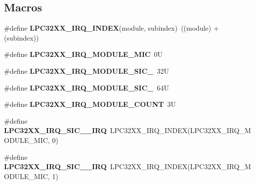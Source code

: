 \subsection*{Macros}
\begin{DoxyCompactItemize}
\item 
\mbox{\label{group__lpc32xx__interrupt_ga82995a9f4d6d60e7406272ca7e5f2d15}} 
\#define {\bfseries L\+P\+C32\+X\+X\+\_\+\+I\+R\+Q\+\_\+\+I\+N\+D\+EX}(module,  subindex)~((module) + (subindex))
\item 
\mbox{\label{group__lpc32xx__interrupt_ga17f517d512c53ce9bf3fa0daf0e6e24d}} 
\#define {\bfseries L\+P\+C32\+X\+X\+\_\+\+I\+R\+Q\+\_\+\+M\+O\+D\+U\+L\+E\+\_\+\+M\+IC}~0U
\item 
\mbox{\label{group__lpc32xx__interrupt_gac38072e9ceffb69d71f811b99d75469b}} 
\#define {\bfseries L\+P\+C32\+X\+X\+\_\+\+I\+R\+Q\+\_\+\+M\+O\+D\+U\+L\+E\+\_\+\+S\+I\+C\+\_}~32U
\item 
\mbox{\label{group__lpc32xx__interrupt_gac5498c0faeeb6900db20a858ac2093c1}} 
\#define {\bfseries L\+P\+C32\+X\+X\+\_\+\+I\+R\+Q\+\_\+\+M\+O\+D\+U\+L\+E\+\_\+\+S\+I\+C\+\_}~64U
\item 
\mbox{\label{group__lpc32xx__interrupt_ga88f3b8aae69d1f2cc6c67c21262e614b}} 
\#define {\bfseries L\+P\+C32\+X\+X\+\_\+\+I\+R\+Q\+\_\+\+M\+O\+D\+U\+L\+E\+\_\+\+C\+O\+U\+NT}~3U
\item 
\mbox{\label{group__lpc32xx__interrupt_gad91fbc0b5d54be2d39839463cdf3e7b2}} 
\#define {\bfseries L\+P\+C32\+X\+X\+\_\+\+I\+R\+Q\+\_\+\+S\+I\+C\+\_\+\_\+\+I\+RQ}~L\+P\+C32\+X\+X\+\_\+\+I\+R\+Q\+\_\+\+I\+N\+D\+EX(L\+P\+C32\+X\+X\+\_\+\+I\+R\+Q\+\_\+\+M\+O\+D\+U\+L\+E\+\_\+\+M\+IC, 0)
\item 
\mbox{\label{group__lpc32xx__interrupt_ga58e2e59d91a9c39e9e441d1e783ac2a4}} 
\#define {\bfseries L\+P\+C32\+X\+X\+\_\+\+I\+R\+Q\+\_\+\+S\+I\+C\+\_\+\_\+\+I\+RQ}~L\+P\+C32\+X\+X\+\_\+\+I\+R\+Q\+\_\+\+I\+N\+D\+EX(L\+P\+C32\+X\+X\+\_\+\+I\+R\+Q\+\_\+\+M\+O\+D\+U\+L\+E\+\_\+\+M\+IC, 1)
\item 

\end{DoxyCompactItemize}
